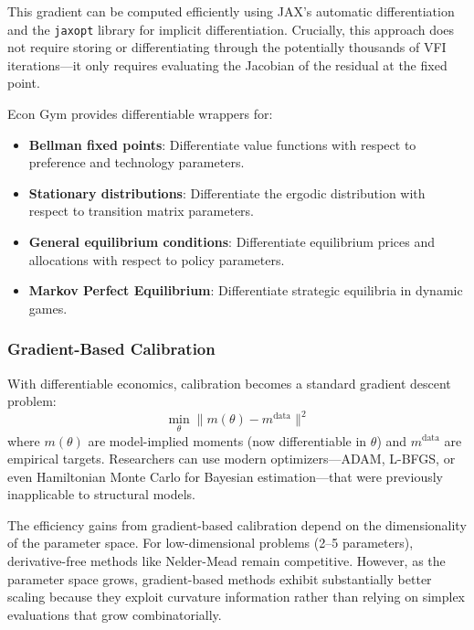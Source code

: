 \documentclass[12pt]{article}
\begin{document}
This gradient can be computed efficiently using JAX's automatic differentiation and the \texttt{jaxopt} library for implicit differentiation. Crucially, this approach does not require storing or differentiating through the potentially thousands of VFI iterations---it only requires evaluating the Jacobian of the residual at the fixed point.

Econ Gym provides differentiable wrappers for:
\begin{itemize}
    \item \textbf{Bellman fixed points}: Differentiate value functions with respect to preference and technology parameters.
    \item \textbf{Stationary distributions}: Differentiate the ergodic distribution with respect to transition matrix parameters.
    \item \textbf{General equilibrium conditions}: Differentiate equilibrium prices and allocations with respect to policy parameters.
    \item \textbf{Markov Perfect Equilibrium}: Differentiate strategic equilibria in dynamic games.
\end{itemize}

\subsubsection{Gradient-Based Calibration}

With differentiable economics, calibration becomes a standard gradient descent problem:
\begin{equation}
    \min_\theta \| m(\theta) - m^{\text{data}} \|^2
\end{equation}
where $m(\theta)$ are model-implied moments (now differentiable in $\theta$) and $m^{\text{data}}$ are empirical targets. Researchers can use modern optimizers---ADAM, L-BFGS, or even Hamiltonian Monte Carlo for Bayesian estimation---that were previously inapplicable to structural models.

The efficiency gains from gradient-based calibration depend on the dimensionality of the parameter space. For low-dimensional problems (2--5 parameters), derivative-free methods like Nelder-Mead remain competitive. However, as the parameter space grows, gradient-based methods exhibit substantially better scaling because they exploit curvature information rather than relying on simplex evaluations that grow combinatorially.

\end{document}
